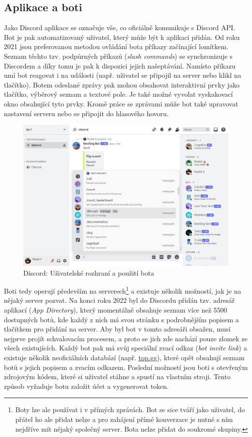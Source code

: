 \documentclass[FM]{tulthesis}
\begin{document}
	\subsection{Aplikace a boti}
	
	Jako Discord aplikace se označuje vše, co oficiálně komunikuje s Discord API. Bot je pak automatizovaný uživatel, který může být k aplikaci přidán. Od roku 2021 jsou preferovanou metodou ovládání bota příkazy začínající lomítkem. Seznam těchto tzv. podpůrných příkazů (\textit{slash commands}) se synchronizuje s Discordem a díky tomu je pak k dispozici jejich našeptávání. Namísto příkazu umí bot reagovat i na události (např. uživatel se připojil na server nebo klikl na tlačítko). Botem odeslané zprávy pak mohou obsahovat interaktivní prvky jako tlačítko, výběrový seznam a textové pole. Je také možné vyvolat vyskakovací okno obsahující tyto prvky. Kromě práce se zprávami může bot také upravovat nastavení serveru nebo se připojit do hlasového hovoru. \cite{pdf_apps101}
	
	\begin{figure}[ht]
		\centering
		\includegraphics[width=\textwidth]{img/DiscordBotCommands}
		\caption{Discord: Uživatelské rozhraní a použití bota}
	\end{figure}
	
	Boti tedy operují především na serverech\footnote{Boty lze ale používat i v přímých zprávách. Bot se sice tváří jako uživatel, do přátel ho ale přidat nelze a pro zahájení přímé konverzace je nutné s ním nejdříve mít nějaký společný server. Bota nelze přidat do soukromé skupiny.} a existuje několik možností, jak je na nějaký server pozvat. Na konci roku 2022 byl do Discordu přidán tzv. adresář aplikací (\textit{App Directory}), který momentálně obsahuje seznam více než 5500 dostupných botů, kde každý z nich má svou stránku s podrobnějším popisem a tlačítkem pro přidání na server. Aby byl bot v tomto adresáři obsažen, musí nejprve projít schvalovacím procesem, a proto se jich zde nachází pouze zlomek ze všech existujících. Každý bot pak má svůj speciální zvací odkaz (\textit{bot invite link}) a existuje několik neoficiálních databází (např. \href{https://top.gg}{top.gg}), které opět obsahují seznam botů s jejich popisem a zvacím odkazem. Poslední možností jsou boti s otevřeným zdrojovým kódem, které si uživatel stáhne a spustí na vlastním stroji. Tento způsob vyžaduje botu založit účet a vygenerovat token.
	
\end{document}
